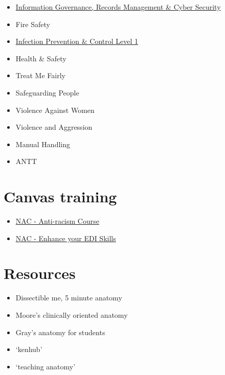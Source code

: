 \begin{itemize}
    \item \href{https://learningiomad.nhs.wales/enrol/index.php?id=1693}{Information Governance, Records Management \& Cyber Security}
    \item Fire Safety
    \item \href{https://learningiomad.nhs.wales/mod/scorm/player.php}{Infection Prevention \& Control Level 1}
    \item Health \& Safety
    \item Treat Me Fairly
    \item Safeguarding People
    \item Violence Against Women
    \item Violence and Aggression
    \item Manual Handling
    \item ANTT 
\end{itemize}

\section{Canvas training}

\begin{itemize}
    \item \href{https://canvas.swansea.ac.uk/enroll/KTCJNL?enrolled=1}{NAC - Anti-racism Course}
    \item \href{https://canvas.swansea.ac.uk/enroll/N8KECX}{NAC - Enhance your EDI Skills}
\end{itemize}


\section{Resources}

\begin{itemize}
    \item Dissectible me, 5 minute anatomy
    \item Moore's clinically oriented anatomy
    \item Gray's anatomy for students
    \item `kenhub'
    \item `teaching anatomy'
\end{itemize}